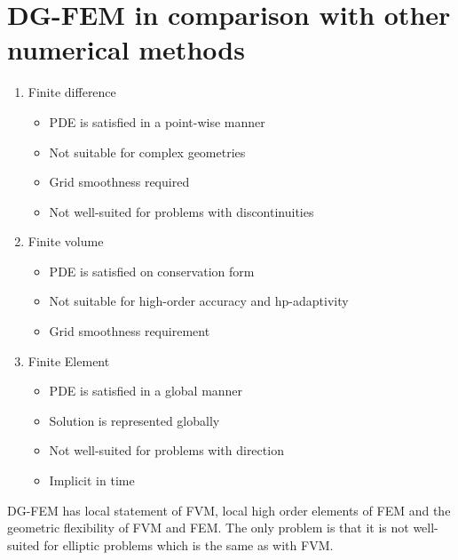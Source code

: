 \documentclass[BoSSSForSolvingConservationLaws.tex]{subfiles}
\begin{document}
\section{DG-FEM in comparison with other numerical methods}
\begin{enumerate}
  \item Finite difference
  \begin{itemize}
    \item PDE is satisfied in a point-wise manner
    \item Not suitable for complex geometries
    \item Grid smoothness required
    \item Not well-suited for problems with discontinuities
  \end{itemize}
  \item Finite volume
  \begin{itemize}
    \item PDE is satisfied on conservation form
    \item Not suitable for high-order accuracy and hp-adaptivity
    \item Grid smoothness requirement
  \end{itemize}
  \item Finite Element
  \begin{itemize}
    \item PDE is satisfied in a global manner
    \item Solution is represented globally
    \item Not well-suited for problems with direction
    \item Implicit in time
  \end{itemize}
\end{enumerate}
DG-FEM has local statement of FVM, local high order elements of FEM and the geometric flexibility of FVM and FEM. The only problem is that it is not well-suited for elliptic problems which is the same as with FVM.
\end{document}
